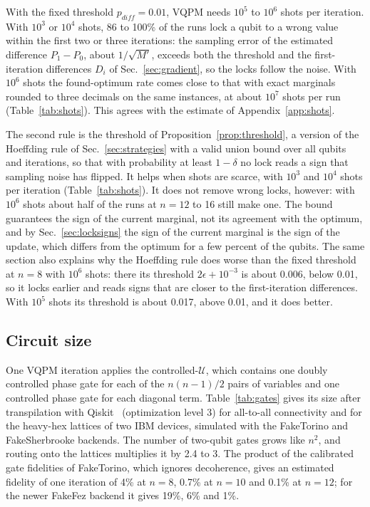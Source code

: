 \documentclass[onecolumn,10pt]{article}
\theoremstyle{remark}
\theoremstyle{plain}
\begin{document}
With the fixed threshold $p_{diff}=0.01$, VQPM needs $10^5$ to $10^6$ shots per iteration. With $10^3$ or $10^4$ shots, 86 to 100\% of the runs lock a qubit to a wrong value within the first two or three iterations: the sampling error of the estimated difference $P_1-P_0$, about $1/\sqrt{M'}$, exceeds both the threshold and the first-iteration differences $D_i$ of Sec.~\ref{sec:gradient}, so the locks follow the noise. With $10^6$ shots the found-optimum rate comes close to that with exact marginals rounded to three decimals on the same instances, at about $10^7$ shots per run (Table~\ref{tab:shots}). This agrees with the estimate of Appendix~\ref{app:shots}.

The second rule is the threshold of Proposition~\ref{prop:threshold}, a version of the Hoeffding rule of Sec.~\ref{sec:strategies} with a valid union bound over all qubits and iterations, so that with probability at least $1-\delta$ no lock reads a sign that sampling noise has flipped. It helps when shots are scarce, with $10^3$ and $10^4$ shots per iteration (Table~\ref{tab:shots}). It does not remove wrong locks, however: with $10^6$ shots about half of the runs at $n=12$ to 16 still make one. The bound guarantees the sign of the current marginal, not its agreement with the optimum, and by Sec.~\ref{sec:locksigns} the sign of the current marginal is the sign of the update, which differs from the optimum for a few percent of the qubits. The same section also explains why the Hoeffding rule does worse than the fixed threshold at $n=8$ with $10^6$ shots: there its threshold $2\epsilon+10^{-3}$ is about 0.006, below 0.01, so it locks earlier and reads signs that are closer to the first-iteration differences. With $10^5$ shots its threshold is about 0.017, above 0.01, and it does better.

\subsection{Circuit size}
\label{sec:circuitcost}
One VQPM iteration applies the controlled-$\mathcal U$, which contains one doubly controlled phase gate for each of the $n(n-1)/2$ pairs of variables and one controlled phase gate for each diagonal term. Table~\ref{tab:gates} gives its size after transpilation with Qiskit~\cite{javadi2024quantum} (optimization level 3) for all-to-all connectivity and for the heavy-hex lattices of two IBM devices, simulated with the FakeTorino and FakeSherbrooke backends. The number of two-qubit gates grows like $n^2$, and routing onto the lattices multiplies it by 2.4 to 3. The product of the calibrated gate fidelities of FakeTorino, which ignores decoherence, gives an estimated fidelity of one iteration of 4\% at $n=8$, 0.7\% at $n=10$ and 0.1\% at $n=12$; for the newer FakeFez backend it gives 19\%, 6\% and 1\%.
\end{document}
